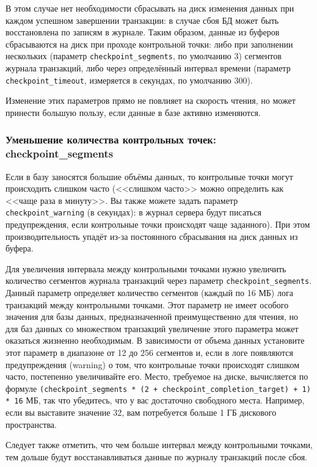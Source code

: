 В этом случае нет необходимости сбрасывать на диск изменения данных при каждом успешном завершении транзакции: в случае сбоя БД может быть восстановлена по записям в журнале. Таким образом, данные из буферов сбрасываются на диск при проходе контрольной точки: либо при заполнении нескольких (параметр \lstinline!checkpoint_segments!, по умолчанию 3) сегментов журнала транзакций, либо через определённый интервал времени (параметр \lstinline!checkpoint_timeout!, измеряется в секундах, по умолчанию 300).

Изменение этих параметров прямо не повлияет на скорость чтения, но может принести большую пользу, если данные в базе активно изменяются.


\subsubsection{Уменьшение количества контрольных точек: checkpoint\_segments}


Если в базу заносятся большие объёмы данных, то контрольные точки могут происходить слишком часто (<<слишком часто>> можно определить как <<чаще раза в минуту>>. Вы также можете задать параметр \lstinline!checkpoint_warning! (в секундах): в журнал сервера будут писаться предупреждения, если контрольные точки происходят чаще заданного). При этом производительность упадёт из-за постоянного сбрасывания на диск данных из буфера.

Для увеличения интервала между контрольными точками нужно увеличить количество сегментов журнала транзакций через параметр \lstinline!checkpoint_segments!. Данный параметр определяет количество сегментов (каждый по 16 МБ) лога транзакций между контрольными точками. Этот параметр не имеет особого значения для базы данных, предназначенной преимущественно для чтения, но для баз данных со множеством транзакций увеличение этого параметра может оказаться жизненно необходимым. В зависимости от объема данных установите этот параметр в диапазоне от 12 до 256 сегментов и, если в логе появляются предупреждения (warning) о том, что контрольные точки происходят слишком часто, постепенно увеличивайте его. Место, требуемое на диске, вычисляется по формуле \lstinline!(checkpoint_segments * (2 + checkpoint_completion_target) + 1) * 16! МБ, так что убедитесь, что у вас достаточно свободного места. Например, если вы выставите значение 32, вам потребуется больше 1 ГБ дискового пространства.

Следует также отметить, что чем больше интервал между контрольными точками, тем дольше будут восстанавливаться данные по журналу транзакций после сбоя.

